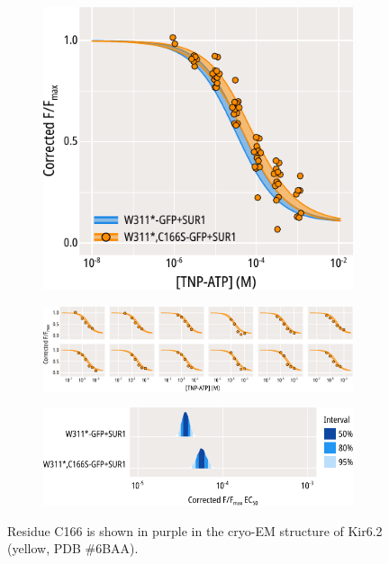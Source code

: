 \begin{figure}[h]
\begin{subfigure}[t]{0.5\textwidth}
		\includegraphics[width=\textwidth]{c166s_2.pdf}
	\end{subfigure}
	\vfill
	\begin{subfigure}[t]{0.9\textwidth}
		\caption{}\label{ch5fig:c166s_indfits}
		\centering
		\includegraphics[width=\textwidth]{c166s_3.pdf}
	\end{subfigure}
	\vfill
	\begin{subfigure}[t]{0.45\textwidth}
		\caption{}\label{ch5fig:c166s_params}
		\centering
		\includegraphics[width=\textwidth]{c166s_4.pdf}
	\end{subfigure}
	\caption[C166S does not alter nucleotide binding]{
	 Residue C166 is shown in purple in the cryo-EM structure of Kir6.2 (yellow, PDB \#6BAA).
}
\end{figure}
